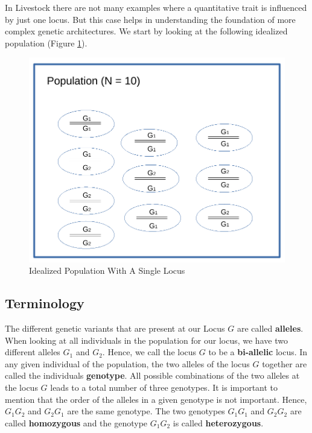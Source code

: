 \documentclass[
]{book}
\theoremstyle{definition}
\theoremstyle{definition}
\theoremstyle{definition}
\theoremstyle{remark}
\begin{document}
In Livestock there are not many examples where a quantitative trait is influenced by just one locus. But this case helps in understanding the foundation of more complex genetic architectures. We start by looking at the following idealized population (Figure \ref{fig:idealpopsingletrait}).

\begin{figure}[!ht]
\includegraphics[width=1\linewidth,]{odg/idealpopsingletrait} \caption{Idealized Population With A Single Locus}\label{fig:idealpopsingletrait}
\end{figure}

\hypertarget{qg-terminology}{%
\subsection{Terminology}\label{qg-terminology}}

The different genetic variants that are present at our Locus \(G\) are called \textbf{alleles}. When looking at all individuals in the population for our locus, we have two different alleles \(G_1\) and \(G_2\). Hence, we call the locus \(G\) to be a \textbf{bi-allelic} locus. In any given individual of the population, the two alleles of the locus \(G\) together are called the individuals \textbf{genotype}. All possible combinations of the two alleles at the locus \(G\) leads to a total number of three genotypes. It is important to mention that the order of the alleles in a given genotype is not important. Hence, \(G_1G_2\) and \(G_2G_1\) are the same genotype. The two genotypes \(G_1G_1\) and \(G_2G_2\) are called \textbf{homozygous} and the genotype \(G_1G_2\) is called \textbf{heterozygous}.
\end{document}
